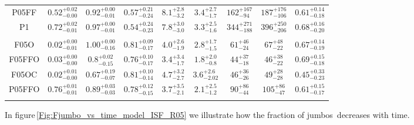 \documentclass[aa]{lib/aa}
\begin{document}
\begin{table}
\begin{tabular}{c c c c c c c c c}
           P05FF   & $0.52^{+0.02}_{-0.00}$ & $0.92^{+0.00}_{-0.01}$ & $0.57^{+0.21}_{-0.24}$ & $8.1^{+2.8}_{-3.2}$ & $3.4^{+2.7}_{-1.7}$ & $162^{+167}_{-94}$ & $187^{+176}_{-106}$ & $0.61^{+0.14}_{-0.18}$ \vspace{0.25em}\\
           P1      & $0.72^{+0.02}_{-0.01}$ & $0.97^{+0.00}_{-0.01}$ & $0.54^{+0.24}_{-0.23}$ & $7.8^{+3.0}_{-3.0}$ & $3.3^{+2.5}_{-1.6}$ & $344^{+271}_{-188}$ & $396^{+250}_{-206}$ & $0.68^{+0.16}_{-0.20}$ \vspace{0.25em}\\
           \hline \vspace{-0.75em}\\
           F05O    & $0.02^{+0.00}_{-0.01}$ & $1.00^{+0.00}_{-0.16}$ & $0.81^{+0.09}_{-0.17}$ & $4.0^{+2.6}_{-1.9}$ & $2.8^{+1.7}_{-1.5}$ & $61^{+46}_{-24}$ & $67^{+48}_{-22}$ & $0.67^{+0.14}_{-0.19}$ \vspace{0.25em}\\
           F05FFO  & $0.03^{+0.00}_{-0.00}$ & $0.8^{+0.02}_{-0.15}$ & $0.76^{+0.10}_{-0.17}$ & $3.4^{+3.4}_{-1.7}$ & $1.8^{+2.0}_{-0.8}$ & $44^{+37}_{-18}$ & $46^{+38}_{-22}$ & $0.69^{+0.15}_{-0.18}$ \vspace{0.25em}\\
           F05OC   & $0.02^{+0.01}_{-0.00}$ & $0.67^{+0.19}_{-0.07}$ & $0.81^{+0.10}_{-0.14}$ & $4.7^{+3.2}_{-2.7}$ & $3.6^{+2.6}_{-2.02}$ & $46^{+36}_{-26}$ & $49^{+28}_{-28}$ & $0.45^{+0.33}_{-0.23}$ \vspace{0.25em}\\
           P05FFO  & $0.76^{+0.01}_{-0.01}$ & $0.89^{+0.03}_{-0.03}$ & $0.78^{+0.12}_{-0.15}$ & $3.7^{+3.5}_{-2.1}$ & $2.1^{+2.5}_{-1.2}$ & $90^{+86}_{-44}$ & $105^{+86}_{-47}$ & $0.61^{+0.15}_{-0.17}$ \vspace{0.25em}\\
           \hline
         \hline                                   %
         \label{Tab:Final_ISF_FFC_Results}
        \end{tabular}
     \end{table}

    In figure\,\ref{Fig:Fjumbo_vs_time_model_ISF_R05} we illustrate
    how the fraction of jumbos\, decreases with time.
    
\end{document}
